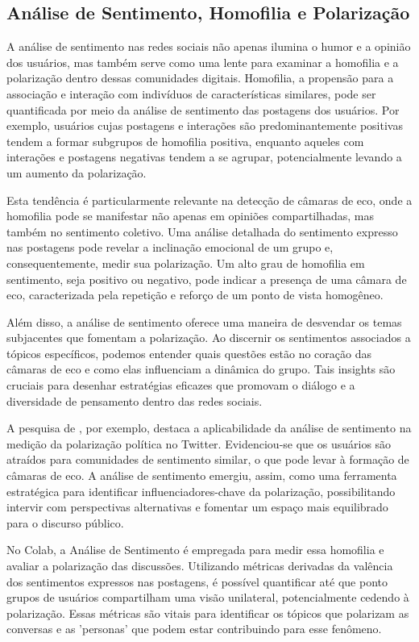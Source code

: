 \subsection*{Análise de Sentimento, Homofilia e Polarização}

A análise de sentimento nas redes sociais não apenas ilumina o humor e a opinião dos usuários, mas também serve como uma lente para examinar a homofilia e a polarização dentro dessas comunidades digitais. Homofilia, a propensão para a associação e interação com indivíduos de características similares, pode ser quantificada por meio da análise de sentimento das postagens dos usuários. Por exemplo, usuários cujas postagens e interações são predominantemente positivas tendem a formar subgrupos de homofilia positiva, enquanto aqueles com interações e postagens negativas tendem a se agrupar, potencialmente levando a um aumento da polarização.

Esta tendência é particularmente relevante na detecção de câmaras de eco, onde a homofilia pode se manifestar não apenas em opiniões compartilhadas, mas também no sentimento coletivo. Uma análise detalhada do sentimento expresso nas postagens pode revelar a inclinação emocional de um grupo e, consequentemente, medir sua polarização. Um alto grau de homofilia em sentimento, seja positivo ou negativo, pode indicar a presença de uma câmara de eco, caracterizada pela repetição e reforço de um ponto de vista homogêneo.

Além disso, a análise de sentimento oferece uma maneira de desvendar os temas subjacentes que fomentam a polarização. Ao discernir os sentimentos associados a tópicos específicos, podemos entender quais questões estão no coração das câmaras de eco e como elas influenciam a dinâmica do grupo. Tais insights são cruciais para desenhar estratégias eficazes que promovam o diálogo e a diversidade de pensamento dentro das redes sociais.

A pesquisa de , por exemplo, destaca a aplicabilidade da análise de sentimento na medição da polarização política no Twitter. Evidenciou-se que os usuários são atraídos para comunidades de sentimento similar, o que pode levar à formação de câmaras de eco. A análise de sentimento emergiu, assim, como uma ferramenta estratégica para identificar influenciadores-chave da polarização, possibilitando intervir com perspectivas alternativas e fomentar um espaço mais equilibrado para o discurso público.

No Colab, a Análise de Sentimento é empregada para medir essa homofilia e avaliar a polarização das discussões. Utilizando métricas derivadas da valência dos sentimentos expressos nas postagens, é possível quantificar até que ponto grupos de usuários compartilham uma visão unilateral, potencialmente cedendo à polarização. Essas métricas são vitais para identificar os tópicos que polarizam as conversas e as 'personas' que podem estar contribuindo para esse fenômeno.

